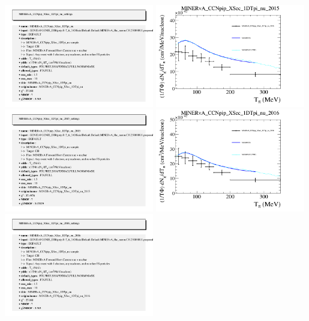 \documentclass{article}
\begin{document}
\includegraphics[width=0.49\textwidth]{figures/nuisance_MINERvA_CCNpip_XSec_1DTpi_nu_info.png}
\centering
\includegraphics[width=0.49\textwidth]{figures/nuisance_MINERvA_CCNpip_XSec_1DTpi_nu_2015_comp.png}
\includegraphics[width=0.49\textwidth]{figures/nuisance_MINERvA_CCNpip_XSec_1DTpi_nu_2015_info.png}
\centering
\includegraphics[width=0.49\textwidth]{figures/nuisance_MINERvA_CCNpip_XSec_1DTpi_nu_2016_comp.png}
\includegraphics[width=0.49\textwidth]{figures/nuisance_MINERvA_CCNpip_XSec_1DTpi_nu_2016_info.png}
\end{document}

